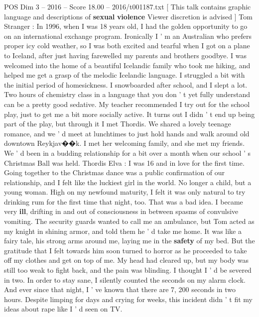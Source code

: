 \begin{textsample}{POS Dim 3 – 2016 – Score 18.00 – 2016/t001187.txt}  \label{ex:f3_pos_008}
[ This talk contains graphic language and descriptions of \textbf{sexual} \textbf{violence} Viewer discretion is advised ] Tom Stranger : In 1996, when I was 18 years old, I had the golden opportunity to go on an international exchange program.
Ironically I ' m an Australian who prefers proper icy cold weather, so I was both excited and tearful when I got on a plane to Iceland, after just having farewelled my parents and brothers goodbye.
I was welcomed into the home of a beautiful Icelandic family who took me hiking, and helped me get a grasp of the melodic Icelandic language.
I struggled a bit with the initial period of homesickness.
I snowboarded after school, and I slept a lot.
Two hours of chemistry class in a language that you don ' t yet fully understand can be a pretty good sedative.
My teacher recommended I try out for the school play, just to get me a bit more socially active.
It turns out I didn ' t end up being part of the play, but through it I met Thordis.
We shared a lovely teenage romance, and we ' d meet at lunchtimes to just hold hands and walk around old downtown Reykjav{\EmojiFont �}{\EmojiFont �}k.
I met her welcoming family, and she met my friends.
We ' d been in a budding relationship for a bit over a month when our school ' s Christmas Ball was held.
Thordis Elva : I was 16 and in love for the first time.
Going together to the Christmas dance was a public confirmation of our relationship, and I felt like the luckiest girl in the world.
No longer a child, but a young woman.
High on my newfound maturity, I felt it was only natural to try drinking rum for the first time that night, too.
That was a bad idea.
I became very \textbf{ill}, drifting in and out of consciousness in between spasms of convulsive vomiting.
The security guards wanted to call me an ambulance, but Tom acted as my knight in shining armor, and told them he ' d take me home.
It was like a fairy tale, his strong arms around me, laying me in the \textbf{safety} of my bed.
But the gratitude that I felt towards him soon turned to horror as he proceeded to take off my clothes and get on top of me.
My head had cleared up, but my body was still too weak to fight back, and the pain was blinding.
I thought I ' d be severed in two.
In order to stay sane, I silently counted the seconds on my alarm clock.
And ever since that night, I ' ve known that there are 7, 200 seconds in two hours.
Despite limping for days and crying for weeks, this incident didn ' t fit my ideas about rape like I ' d seen on TV.

\end{textsample}
